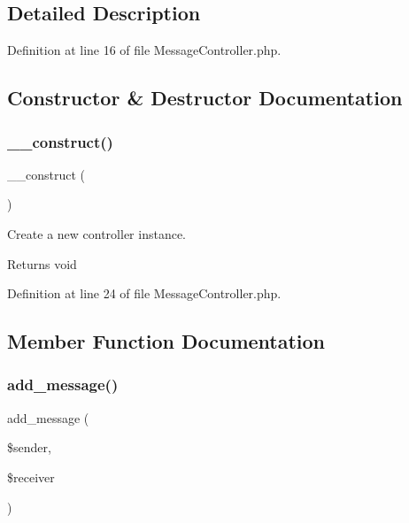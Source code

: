 \subsection{Detailed Description}


Definition at line 16 of file Message\+Controller.\+php.



\subsection{Constructor \& Destructor Documentation}
\mbox{\label{class_responsive_1_1_http_1_1_controllers_1_1_message_controller_a095c5d389db211932136b53f25f39685}} 
\subsubsection{\texorpdfstring{\_\_construct()}{\_\_construct()}}
{\footnotesize\ttfamily \+\_\+\+\_\+construct (\begin{DoxyParamCaption}{ }\end{DoxyParamCaption})}

Create a new controller instance.

\begin{DoxyReturn}{Returns}
void 
\end{DoxyReturn}


Definition at line 24 of file Message\+Controller.\+php.



\subsection{Member Function Documentation}
\mbox{\label{class_responsive_1_1_http_1_1_controllers_1_1_message_controller_a0a82c28e8fefda0e67d25da583ad6525}} 
\subsubsection{\texorpdfstring{add\_message()}{add\_message()}}
{\footnotesize\ttfamily add\+\_\+message (\begin{DoxyParamCaption}\item[{}]{\$sender,  }\item[{}]{\$receiver }\end{DoxyParamCaption})}



